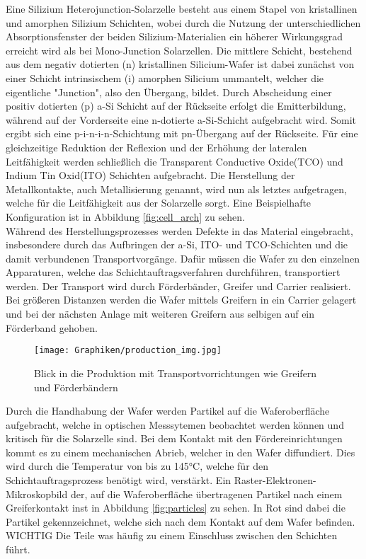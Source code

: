    Eine Silizium Heterojunction-Solarzelle besteht aus einem Stapel von kristallinen und amorphen Silizium Schichten, wobei durch die Nutzung der unterschiedlichen Absorptionsfenster der beiden Silizium-Materialien ein höherer Wirkungsgrad erreicht wird als bei Mono-Junction Solarzellen. Die mittlere Schicht, bestehend aus dem negativ dotierten (n) kristallinen Silicium-Wafer ist dabei zunächst von einer Schicht intrinsischem (i) amorphen Silicium ummantelt, welcher die eigentliche "Junction", also den Übergang, bildet. Durch Abscheidung einer positiv dotierten (p) a-Si Schicht auf der Rückseite erfolgt die Emitterbildung, während auf der Vorderseite eine n-dotierte a-Si-Schicht aufgebracht wird. Somit ergibt sich eine p-i-n-i-n-Schichtung mit pn-Übergang auf der Rückseite. Für eine gleichzeitige Reduktion der Reflexion und der Erhöhung der lateralen Leitfähigkeit werden schließlich die Transparent Conductive Oxide(TCO) und Indium Tin Oxid(ITO) \cite{SHJDeWolfDescoeudresHolmanBallif2012} Schichten aufgebracht. Die Herstellung der Metallkontakte, auch Metallisierung genannt, wird nun als letztes aufgetragen, welche für die Leitfähigkeit aus der Solarzelle sorgt. Eine Beispielhafte Konfiguration ist in Abbildung \ref{fig:cell_arch} zu sehen. \\
   Während des Herstellungsprozesses werden Defekte in das Material eingebracht, insbesondere durch das Aufbringen der a-Si, ITO- und TCO-Schichten und die damit verbundenen Transportvorgänge. Dafür müssen die Wafer zu den einzelnen Apparaturen, welche das Schichtauftragsverfahren durchführen, transportiert werden. Der Transport wird durch Förderbänder, Greifer und Carrier realisiert. Bei größeren Distanzen werden die Wafer mittels Greifern in ein Carrier gelagert und bei der nächsten Anlage mit weiteren Greifern aus selbigen auf ein Förderband gehoben. \\

   \begin{figure}[h!]
    \centering
    \texttt{[image: Graphiken/production\_img.jpg]}
    \caption{Blick in die Produktion mit Transportvorrichtungen wie Greifern und Förderbändern\cite{tray_img23}}
    \label{fig:prod_img}
\end{figure}
   
   Durch die Handhabung der Wafer werden Partikel auf die Waferoberfläche aufgebracht, welche in optischen Messsytemen beobachtet werden können und kritisch für die Solarzelle sind. Bei dem Kontakt mit den Fördereinrichtungen kommt es zu einem mechanischen Abrieb, welcher in den Wafer diffundiert. Dies wird durch die Temperatur von bis zu 145°C, welche für den Schichtauftragsprozess benötigt wird, verstärkt. Ein Raster-Elektronen-Mikroskopbild der, auf die Waferoberfläche übertragenen Partikel nach einem Greiferkontakt inst in Abbildung \ref{fig:particles} zu sehen. In Rot sind dabei die Partikel gekennzeichnet, welche sich nach dem Kontakt auf dem Wafer befinden. WICHTIG Die Teile was häufig zu einem Einschluss zwischen den Schichten führt. \\
   
